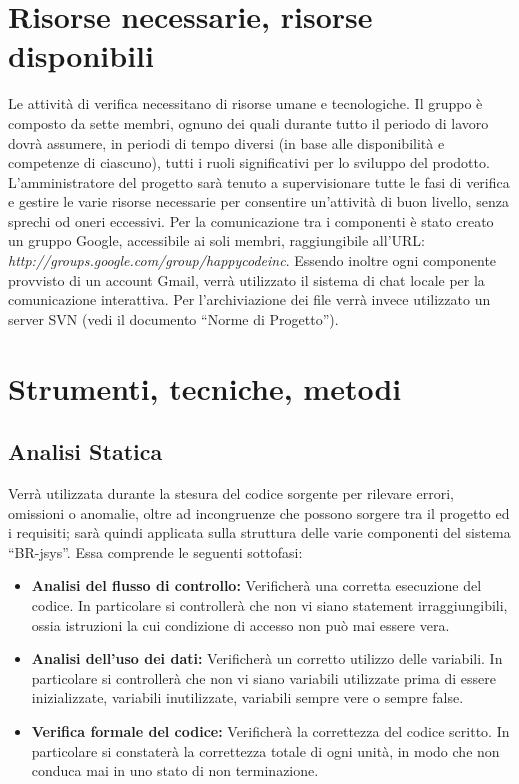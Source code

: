 \documentclass[11pt,titlepage,a4paper]{report}
\begin{document}
\section{Risorse necessarie, risorse disponibili}
Le attivit\`a di verifica necessitano di risorse umane e tecnologiche. Il gruppo \`e composto da sette membri, ognuno dei quali durante tutto il periodo di lavoro dovr\`a assumere, in periodi di tempo diversi (in base alle disponibilit\`a e competenze di ciascuno), tutti i ruoli significativi per lo sviluppo del prodotto. L'amministratore del progetto sar\`a tenuto a supervisionare tutte le fasi di verifica e gestire le varie risorse necessarie per consentire un'attivit\`a di buon livello, senza sprechi od oneri eccessivi. Per la comunicazione tra i componenti \`e stato creato un gruppo Google, accessibile ai soli membri, raggiungibile all'URL: \textit{http://groups.google.com/group/happycodeinc}. Essendo inoltre ogni componente provvisto di un account Gmail, verr\`a utilizzato il sistema di chat locale per la comunicazione interattiva. Per l'archiviazione dei file verr\`a invece utilizzato un server SVN (vedi il documento ``Norme di Progetto'').

\section{Strumenti, tecniche, metodi}
\subsection{Analisi Statica}
Verr\`a utilizzata durante la stesura del codice sorgente per rilevare errori, omissioni o anomalie, oltre ad incongruenze che possono sorgere tra il progetto ed i requisiti; sar\`a quindi applicata sulla struttura delle varie componenti del sistema ``BR-jsys''. Essa comprende le seguenti sottofasi:
\begin{itemize}
\item \textbf{Analisi del flusso di controllo:} Verificher\`a una corretta esecuzione del codice.
In particolare si controller\`a che non vi siano statement irraggiungibili, ossia istruzioni la cui condizione di accesso non pu\`o mai essere vera.
\item \textbf{Analisi dell'uso dei dati:} Verificher\`a un corretto utilizzo delle variabili.
In particolare si controller\`a che non vi siano variabili utilizzate prima di essere inizializzate, variabili inutilizzate, variabili sempre vere o sempre false.
\item \textbf{Verifica formale del codice:} Verificher\`a la correttezza del codice scritto. In particolare si constater\`a la correttezza totale di ogni unit\`a, in modo che non conduca mai in uno stato di non terminazione.
\end{itemize}
\end{document}
